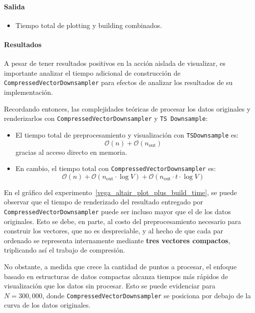 \paragraph{Salida}
\begin{itemize}
    \item Tiempo total de plotting y building combinados.
\end{itemize}

\newpage
\paragraph{Resultados}
\vspace{0.5em}
\noindent
\VegaAltairPlottingBuildingComparison
\newpage

A pesar de tener resultados positivos en la acción aislada de visualizar, es importante analizar el tiempo adicional de construcción de \texttt{CompressedVectorDownsampler} para efectos de analizar los resultados de su implementación.

Recordando entonces, las complejidades teóricas de procesar los datos originales y renderizarlos con \texttt{CompressedVectorDownsampler} y \texttt{TS Downsample}:

\begin{itemize}
    \item El tiempo total de preprocesamiento y visualización con \texttt{TSDownsample} es:
    \[
    \mathcal{O}(n) + \mathcal{O}(n_{\text{out}})
    \]
    gracias al acceso directo en memoria.

    \item En cambio, el tiempo total con \texttt{CompressedVectorDownsampler} es:
    \[
    \mathcal{O}(n) + \mathcal{O}(n_{\text{out}} \cdot \log V) + \mathcal{O}(n_{\text{out}} \cdot t \cdot \log V)
    \]

\end{itemize}

En el gráfico del experimento~\ref{vega_altair_plot_plus_build_time}, se puede observar que el tiempo de renderizado del resultado entregado por \texttt{CompressedVectorDownsampler} puede ser incluso mayor que el de los datos originales. Esto se debe, en parte, al costo del preprocesamiento necesario para construir los vectores, que no es despreciable, y al hecho de que cada par ordenado se representa internamente mediante \textbf{tres vectores compactos}, triplicando así el trabajo de compresión.

No obstante, a medida que crece la cantidad de puntos a procesar, el enfoque basado en estructuras de datos compactas alcanza tiempos más rápidos de visualización que los datos sin procesar. Esto se puede evidenciar para $N = 300,000$, donde \texttt{CompressedVectorDownsampler} se posiciona por debajo de la curva de los datos originales. 

